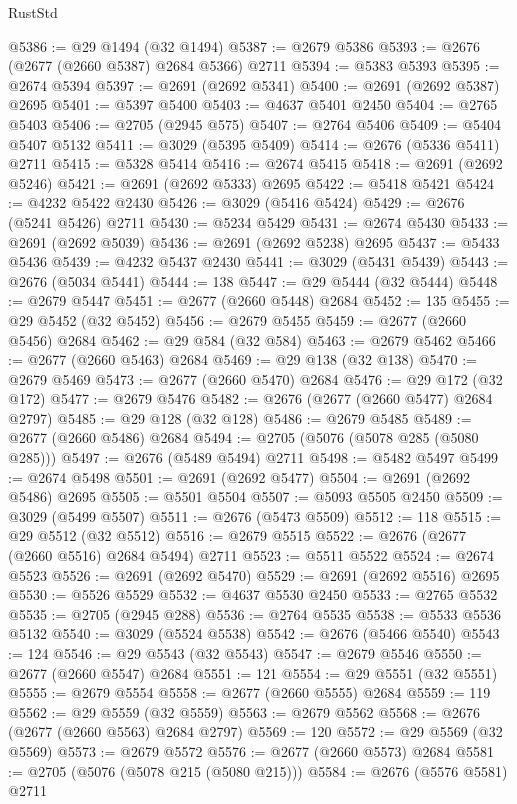\begin{lexlean}{RustStd}
\begin{coremodule}
{\begin{coremodule}
{{{{{{{{{{{{{{{{{{{{{{{{{{{{{{{{{{{{{{{{{{{{{{{{{{{{{{{@5386 := @29 @1494 (@32 @1494)
@5387 := @2679 @5386
@5393 := @2676 (@2677 (@2660 @5387) @2684 @5366) @2711
@5394 := @5383 @5393
@5395 := @2674 @5394
@5397 := @2691 (@2692 @5341)
@5400 := @2691 (@2692 @5387) @2695
@5401 := @5397 @5400
@5403 := @4637 @5401 @2450
@5404 := @2765 @5403
@5406 := @2705 (@2945 @575)
@5407 := @2764 @5406
@5409 := @5404 @5407 @5132
@5411 := @3029 (@5395 @5409)
@5414 := @2676 (@5336 @5411) @2711
@5415 := @5328 @5414
@5416 := @2674 @5415
@5418 := @2691 (@2692 @5246)
@5421 := @2691 (@2692 @5333) @2695
@5422 := @5418 @5421
@5424 := @4232 @5422 @2430
@5426 := @3029 (@5416 @5424)
@5429 := @2676 (@5241 @5426) @2711
@5430 := @5234 @5429
@5431 := @2674 @5430
@5433 := @2691 (@2692 @5039)
@5436 := @2691 (@2692 @5238) @2695
@5437 := @5433 @5436
@5439 := @4232 @5437 @2430
@5441 := @3029 (@5431 @5439)
@5443 := @2676 (@5034 @5441)
@5444 := 138
@5447 := @29 @5444 (@32 @5444)
@5448 := @2679 @5447
@5451 := @2677 (@2660 @5448) @2684
@5452 := 135
@5455 := @29 @5452 (@32 @5452)
@5456 := @2679 @5455
@5459 := @2677 (@2660 @5456) @2684
@5462 := @29 @584 (@32 @584)
@5463 := @2679 @5462
@5466 := @2677 (@2660 @5463) @2684
@5469 := @29 @138 (@32 @138)
@5470 := @2679 @5469
@5473 := @2677 (@2660 @5470) @2684
@5476 := @29 @172 (@32 @172)
@5477 := @2679 @5476
@5482 := @2676 (@2677 (@2660 @5477) @2684 @2797)
@5485 := @29 @128 (@32 @128)
@5486 := @2679 @5485
@5489 := @2677 (@2660 @5486) @2684
@5494 := @2705 (@5076 (@5078 @285 (@5080 @285)))
@5497 := @2676 (@5489 @5494) @2711
@5498 := @5482 @5497
@5499 := @2674 @5498
@5501 := @2691 (@2692 @5477)
@5504 := @2691 (@2692 @5486) @2695
@5505 := @5501 @5504
@5507 := @5093 @5505 @2450
@5509 := @3029 (@5499 @5507)
@5511 := @2676 (@5473 @5509)
@5512 := 118
@5515 := @29 @5512 (@32 @5512)
@5516 := @2679 @5515
@5522 := @2676 (@2677 (@2660 @5516) @2684 @5494) @2711
@5523 := @5511 @5522
@5524 := @2674 @5523
@5526 := @2691 (@2692 @5470)
@5529 := @2691 (@2692 @5516) @2695
@5530 := @5526 @5529
@5532 := @4637 @5530 @2450
@5533 := @2765 @5532
@5535 := @2705 (@2945 @288)
@5536 := @2764 @5535
@5538 := @5533 @5536 @5132
@5540 := @3029 (@5524 @5538)
@5542 := @2676 (@5466 @5540)
@5543 := 124
@5546 := @29 @5543 (@32 @5543)
@5547 := @2679 @5546
@5550 := @2677 (@2660 @5547) @2684
@5551 := 121
@5554 := @29 @5551 (@32 @5551)
@5555 := @2679 @5554
@5558 := @2677 (@2660 @5555) @2684
@5559 := 119
@5562 := @29 @5559 (@32 @5559)
@5563 := @2679 @5562
@5568 := @2676 (@2677 (@2660 @5563) @2684 @2797)
@5569 := 120
@5572 := @29 @5569 (@32 @5569)
@5573 := @2679 @5572
@5576 := @2677 (@2660 @5573) @2684
@5581 := @2705 (@5076 (@5078 @215 (@5080 @215)))
@5584 := @2676 (@5576 @5581) @2711
}}}}}}}}}}}}}}}}}}}}}}}}}}}}}}}}}}}}}}}}}}}}}}}}}}}}}}}
\end{coremodule}}
\end{coremodule}
\end{lexlean}

